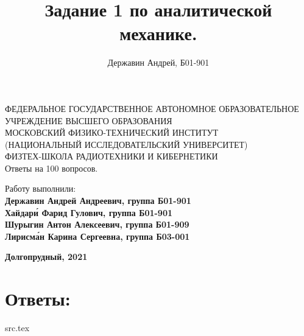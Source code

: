 \documentclass[15pt,a4paper,reqno]{article}
\title{Задание 1 по аналитической механике.}
\author{Державин Андрей, Б01-901}
\date{}
\begin{document}
\begin{center}
  \hfill \break
  \hfill \break
  {\small ФЕДЕРАЛЬНОЕ ГОСУДАРСТВЕННОЕ АВТОНОМНОЕ ОБРАЗОВАТЕЛЬНОЕ\\ УЧРЕЖДЕНИЕ ВЫСШЕГО ОБРАЗОВАНИЯ\\ МОСКОВСКИЙ ФИЗИКО-ТЕХНИЧЕСКИЙ ИНСТИТУТ\\ (НАЦИОНАЛЬНЫЙ ИССЛЕДОВАТЕЛЬСКИЙ УНИВЕРСИТЕТ)\\ ФИЗТЕХ-ШКОЛА РАДИОТЕХНИКИ И КИБЕРНЕТИКИ}\\
  \hfill \break
  \hfill \break
  \hfill \break
  \hfill \break
  \hfill \break
  \hfill \break
  \Huge{Ответы на 100 вопросов.}\\
\end{center}
\hfill \break
\hfill \break
\hfill \break
\hfill \break
\hfill \break
\hfill \break
\hfill \break
\hfill \break

\hfill \break
\hfill \break
\hfill \break
\hfill \break
\hfill \break
\hfill \break

\begin{flushright}
  \normalsize{Работу выполнили:}\\
  \normalsize{\textbf{Державин Андрей Андреевич, группа Б01-901}}\\
  \normalsize{\textbf{Хайдар\'{и} Фарид Гулович, группа Б01-901}}\\
  \normalsize{\textbf{Шурыгин Антон Алексеевич, группа Б01-909}}\\
  \normalsize{\textbf{Лирисм\'{а}н Карина Сергеевна, группа Б03-001}}
\end{flushright}

\begin{center}
  \normalsize{\textbf{Долгопрудный, 2021}}
\end{center}


\thispagestyle{empty} %


\newpage
\thispagestyle{plain}
\tableofcontents
\thispagestyle{plain}
\newpage


\part*{Ответы:}
{src.tex}
\end{document}
